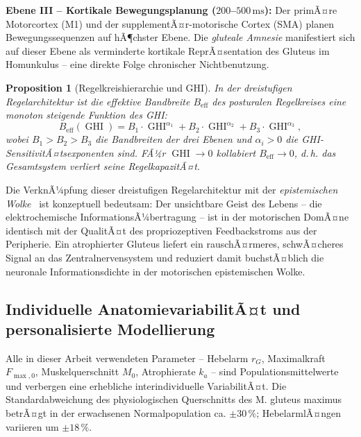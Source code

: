 ﻿\documentclass[12pt,a4paper]{report}
\theoremstyle{plain}
\newtheorem{proposition}[theorem]{Proposition}
\theoremstyle{definition}
\theoremstyle{remark}
\DeclareMathOperator{\GHI}{GHI}
\begin{document}
	\textbf{Ebene III -- Kortikale Bewegungsplanung ($200$--$500\,\mathrm{ms}$):}
	Der primÃ¤re Motorcortex (M1) und der supplementÃ¤r-motorische Cortex (SMA)
	planen Bewegungssequenzen auf hÃ¶chster Ebene. Die \emph{gluteale Amnesie}
	manifestiert sich auf dieser Ebene als verminderte kortikale ReprÃ¤sentation
	des Gluteus im Homunkulus -- eine direkte Folge chronischer Nichtbenutzung.
	
	\begin{proposition}[Regelkreishierarchie und GHI]
		\label{prop:regelkreis}
		In der dreistufigen Regelarchitektur ist die effektive Bandbreite
		$B_\mathrm{eff}$ des posturalen Regelkreises eine monoton steigende
		Funktion des GHI:
		\[
		B_\mathrm{eff}(\GHI) = B_1 \cdot \GHI^{\alpha_1}
		+ B_2 \cdot \GHI^{\alpha_2} + B_3 \cdot \GHI^{\alpha_3},
		\]
		wobei $B_1 > B_2 > B_3$ die Bandbreiten der drei Ebenen und
		$\alpha_i > 0$ die GHI-SensitivitÃ¤ts\-exponenten sind. FÃ¼r
		$\GHI \to 0$ kollabiert $B_\mathrm{eff} \to 0$, d.\,h. das
		Gesamtsystem verliert seine RegelkapazitÃ¤t.
	\end{proposition}
	
	Die VerknÃ¼pfung dieser dreistufigen Regelarchitektur mit der
	\emph{epistemischen Wolke}~\cite{epp2026wolke} ist konzeptuell bedeutsam:
	Der unsichtbare Geist des Lebens -- die elektrochemische
	InformationsÃ¼bertragung -- ist in der motorischen DomÃ¤ne identisch mit
	der QualitÃ¤t des propriozeptiven Feedbackstroms aus der Peripherie.
	Ein atrophierter Gluteus liefert ein rauschÃ¤rmeres, schwÃ¤cheres
	Signal an das Zentralnervensystem und reduziert damit buchstÃ¤blich
	die neuronale Informationsdichte in der motorischen epistemischen Wolke.
	
	\subsection{Individuelle AnatomievariabilitÃ¤t und personalisierte Modellierung}
	\label{subsec:variabilitaet}
	
	Alle in dieser Arbeit verwendeten Parameter -- Hebelarm $r_G$,
	Maximalkraft $F_{\max,0}$, Muskelquerschnitt $M_0$, Atrophierate $k_a$ --
	sind Populationsmittelwerte und verbergen eine erhebliche interindividuelle
	VariabilitÃ¤t. Die Standardabweichung des physiologischen Querschnitts
	des M. gluteus maximus betrÃ¤gt in der erwachsenen Normalpopulation
	ca. $\pm 30\,\%$; HebelarmlÃ¤ngen variieren um $\pm 18\,\%$.
	
\end{document}
